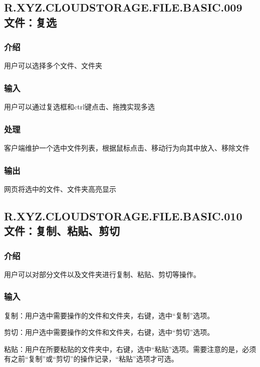\subsection{R.XYZ.CLOUDSTORAGE.FILE.BASIC.009 文件：复选}

\subsubsection{介绍}

用户可以选择多个文件、文件夹

\subsubsection{输入}

用户可以通过复选框和ctrl键点击、拖拽实现多选

\subsubsection{处理}

客户端维护一个选中文件列表，根据鼠标点击、移动行为向其中放入、移除文件

\subsubsection{输出}

网页将选中的文件、文件夹高亮显示



\subsection{R.XYZ.CLOUDSTORAGE.FILE.BASIC.010 文件：复制、粘贴、剪切}

\subsubsection{介绍} 
用户可以对部分文件以及文件夹进行复制、粘贴、剪切等操作。

\subsubsection{输入} 
复制：用户选中需要操作的文件和文件夹，右键，选中“复制”选项。

剪切：用户选中需要操作的文件和文件夹，右键，选中“剪切”选项。

粘贴：用户在所要粘贴的文件夹中，右键，选中“粘贴”选项。需要注意的是，必须有之前“复制”或“剪切”的操作记录，“粘贴”选项才可选。

